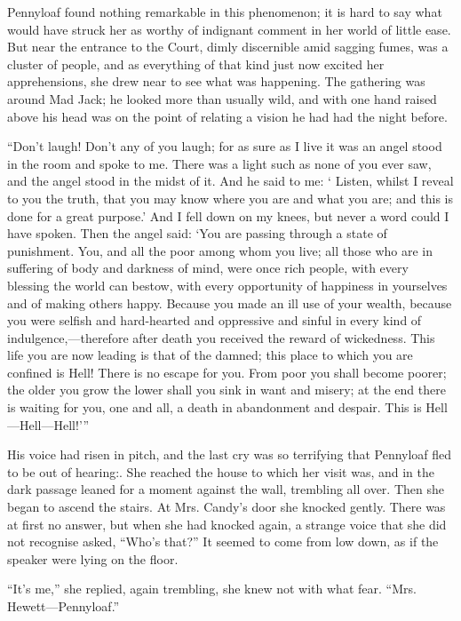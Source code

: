Pennyloaf found nothing remarkable in this phenomenon; it is hard to say
what would have struck her as worthy of indignant comment in her world
of little ease. But near the entrance to the Court, dimly discernible
amid sagging fumes, was a cluster of people, and as everything of that
kind just now excited her apprehensions, she drew near to see what was
happening. The gathering was around Mad Jack; he looked more than
usually wild, and with one hand raised above his head was {}on the point
of relating a vision he had had the night before.

``Don't laugh! Don't any of you laugh; for as sure as I live it was an
angel stood in the room and spoke to me. There was a light such as none
of you ever saw, and the angel stood in the midst of it. And he said to
me: ` Listen, whilst I reveal to you the truth, that you may know where
you are and what you are; and this is done for a great purpose.' And I
fell down on my knees, but never a word could I have spoken. Then the
angel said: `You are passing through a state of punishment. You, and all
the poor among whom you live; all those who are in suffering of body and
darkness of mind, were once rich people, with every blessing the world
can bestow, with every opportunity of happiness in yourselves and of
making others happy. Because you made an ill use of your wealth, because
you were selfish and hard-hearted and oppressive and sinful in every
kind of indulgence,---therefore after death you received the reward of
wickedness. This life you are now leading is that of the damned; this
place to which you are confined is Hell! There is no escape for {}you.
From poor you shall become poorer; the older you grow the lower shall
you sink in want and misery; at the end there is waiting for you, one
and all, a death in abandonment and despair. This is
Hell---Hell---Hell!'''

His voice had risen in pitch, and the last cry was so terrifying that
Pennyloaf fled to be out of hearing:. She reached the house to which her
visit was, and in the dark passage leaned for a moment against the wall,
trembling all over. Then she began to ascend the stairs. At Mrs. Candy's
door she knocked gently. There was at first no answer, but when she had
knocked again, a strange voice that she did not recognise asked, ``Who's
that?'' It seemed to come from low down, as if the speaker were lying on
the floor.

``It's me,'' she replied, again trembling, she knew not with what fear.
``Mrs. Hewett---Pennyloaf.''

